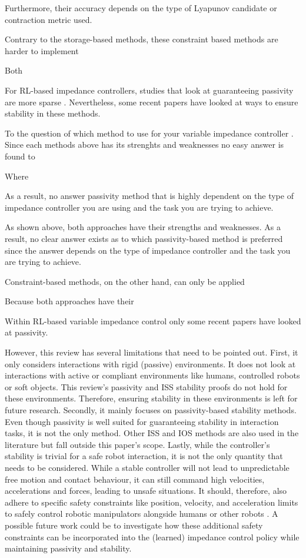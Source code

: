 Furthermore, their accuracy depends on the type of Lyapunov candidate or contraction metric used. 

Contrary to the storage-based methods, these constraint based methods are harder to implement 



Both 


For RL-based impedance controllers, studies that look at guaranteeing passivity are more sparse
. Nevertheless, some recent papers have looked at ways to ensure stability in these methods.


To the question of which method to use for your variable impedance controller . Since each methods above has its strenghts and weaknesses no easy answer is found to

Where 

As a result, no answer passivity method that is highly dependent on the type of impedance controller you are using and the task you are trying to achieve.

As shown above, both approaches have their strengths and weaknesses. As a result, no clear answer exists as to which passivity-based method is preferred since the answer depends on the type of impedance controller and the task you are trying to achieve. 

Constraint-based methods, on the other hand, can only be applied


Because both approaches have their

Within RL-based variable impedance control only some recent papers have looked at passivity. 


However, this review has several limitations that need to be pointed out. First, it only considers interactions with rigid (passive) environments. It does not look at interactions with active or compliant environments like humans, controlled robots or soft objects. This review's passivity and ISS stability proofs do not hold for these environments. Therefore, ensuring stability in these environments is left for future research. Secondly, it mainly focuses on passivity-based stability methods. Even though passivity is well suited for guaranteeing stability in interaction tasks, it is not the only method. Other ISS and IOS methods are also used in the literature but fall outside this paper's scope. Lastly, while the controller's stability is trivial for a safe robot interaction, it is not the only quantity that needs to be considered. While a stable controller will not lead to unpredictable free motion and contact behaviour, it can still command high velocities, accelerations and forces, leading to unsafe situations. It should, therefore, also adhere to specific safety constraints like position, velocity, and acceleration limits to safely control robotic manipulators alongside humans or other robots \cite{lasotaSurveyMethodsSafe2017,raiolaDevelopmentSafetyEnergyAware2018,chowLyapunovbasedApproachSafe2018,zacharakiSafetyBoundsHuman2020,benziOptimizationApproachRobust2021,sadanandananandSafeLearningControl2021,sharkawyHumanRobotInteraction2022}. A possible future work could be to investigate how these additional safety constraints can be incorporated into the (learned) impedance control policy while maintaining passivity and stability.

